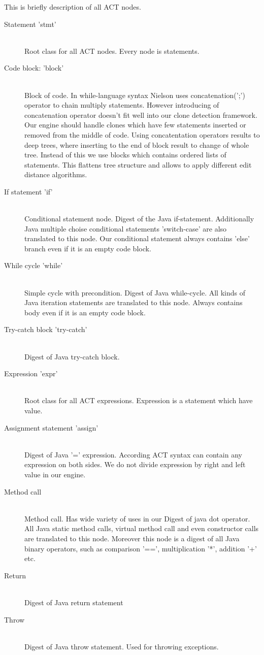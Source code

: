 This is briefly description of all ACT nodes.
\begin{description}
  \item[Statement 'stmt'] \hfill \\
  Root class for all ACT nodes. Every node is statements.
  \item[Code block: 'block'] \hfill \\
  Block of code. 
  In while-language syntax Nielson uses concatenation(';') operator to chain multiply statements\cite{Nielson&Nielson93}.
  However introducing of concatenation operator doesn't fit well into our clone detection framework.
  Our engine should handle clones which have few statements inserted or removed from the middle of code.
  Using concatentation operators results to deep trees, where inserting to the end of block result to change of whole tree.
  Instead of this we use blocks which contains ordered lists of statements.
  This flattens tree structure and allows to apply different edit distance algorithms.
  \item[If statement 'if'] \hfill \\
  Conditional statement node.
  Digest of the Java if-statement.
  Additionally Java multiple choise conditional statements 'switch-case' are also translated to this node.
  Our conditional statement always contains 'else' branch even if it is an empty code block.
  \item[While cycle 'while'] \hfill \\
  Simple cycle with precondition.
  Digest of Java while-cycle.
  All kinds of Java iteration statements are translated to this node.
  Always contains body even if it is an empty code block.
  \item[Try-catch block 'try-catch'] \hfill \\
  Digest of Java try-catch block.
  \item[Expression 'expr'] \hfill \\
  Root class for all ACT expressions.
  Expression is a statement which have value.
  \item[Assignment statement 'assign'] \hfill \\
  Digest of Java '=' expression.
  According ACT syntax can contain any expression on both sides.
  We do not divide expression by right and left value in our engine.
  \item[Method call] \hfill \\
  Method call.
  Has wide variety of uses in our
  Digest of java dot operator.
  All Java static method calls, virtual method call and even constructor calls are translated to this node.
  Moreover this node is a digest of all Java binary operators, such as comparison '==', multiplication '*', addition '+' etc.
  \item[Return] \hfill \\
  Digest of Java return statement
  \item[Throw] \hfill \\
  Digest of Java throw statement.
  Used for throwing exceptions.
\end{description}

